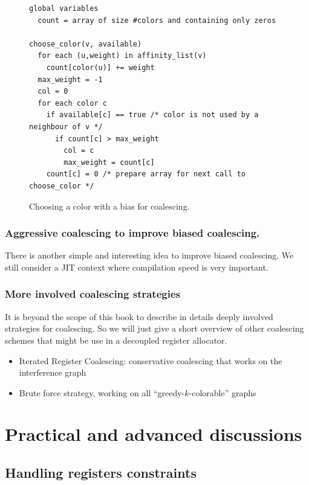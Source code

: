 {\begin{figure}
  \begin{verbatim}
global variables
  count = array of size #colors and containing only zeros

choose_color(v, available)
  for each (u,weight) in affinity_list(v)
    count[color(u)] += weight
  max_weight = -1
  col = 0
  for each color c
    if available[c] == true /* color is not used by a neighbour of v */
      if count[c] > max_weight
        col = c
        max_weight = count[c]
    count[c] = 0 /* prepare array for next call to choose_color */
  \end{verbatim}
  \caption{Choosing a color with a bias for coalescing.}
  \label{code:choose-color}
\end{figure}


\subsubsection{Aggressive coalescing to improve biased coalescing.}

There is another simple and interesting idea to improve biased coalescing. We 
still consider a JIT context where compilation speed is very important.


\subsubsection{More involved coalescing strategies}

It is beyond the scope of this book to describe in details deeply involved strategies for coalescing.
So we will just give a short overview of other coalescing schemes that might be use in a decoupled register allocator.
\begin{itemize}
  \item Iterated Register Coalescing: conservative coalescing that works on the interference graph
  \item Brute force strategy, working on all ``greedy-$k$-colorable'' graphs
\end{itemize}




\section{Practical and advanced discussions}
\label{sec:practical-regalloc}


\subsection{Handling registers constraints}

}
